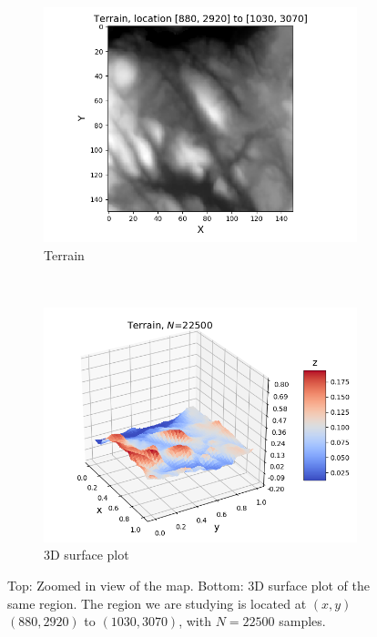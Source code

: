 \documentclass[a4paper]{article}
\begin{document}
\begin{figure}[H]
  \centering
  \begin{subfigure}{0.79\textwidth}
  	\centering
    \includegraphics[scale=0.60]{../figures/task_f/terrain_n150_880_2920.png}
    \caption{Terrain}
  \end{subfigure}\\
  \begin{subfigure}{0.79\textwidth}
  	\centering
    \includegraphics[scale=0.60]{../figures/task_f/surf_surf_terrain_n150_880_2920.png}
    \caption{3D surface plot}
  \end{subfigure}
  \caption{Top: Zoomed in view of the map. Bottom: 3D surface plot of the same region. The region we are studying is located at $(x,y)$ $(880, 2920)$ to $(1030, 3070)$, with $N=22500$ samples.}
  \label{fig:terrain_patch}
\end{figure}
\end{document}
